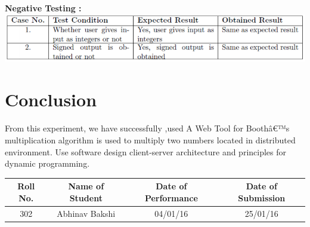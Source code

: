 \documentclass[a4paper,12pt]{article}
\begin{document}
\textbf{Negative Testing :}\\
\includegraphics[width=\textwidth]{booth_negative}
\vspace{30px}


\section{Conclusion}
	\paragraph{} From this experiment, we have successfully ,used A Web Tool for Boothâ€™s multiplication algorithm is used to multiply two numbers located in distributed environment. Use software design client-server architecture and principles for dynamic programming.
\vspace{20px}
\begin{center}
	\begin{tabular}
		{|c|c|c|c|}\hline
		{\bf Roll No.}		&{\bf Name of Student}		&{\bf Date of Performance}  				&{\bf Date of Submission}  \\ \hline
		{302}	&	{Abhinav Bakshi}& {04/01/16}		&  {25/01/16} \\ \hline
	\end{tabular}\\ 
\end{center}
\end{document}
